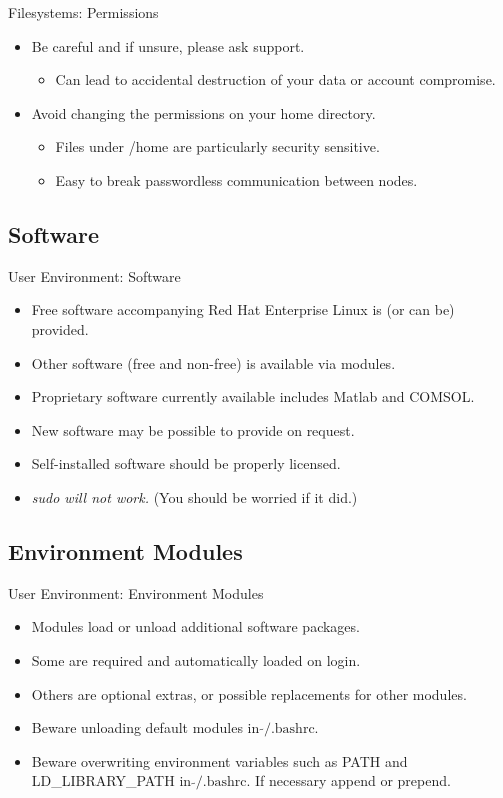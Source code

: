 \begin{frame}{Filesystems: Permissions}
\begin{itemize}
\item{\color{red}Be careful and if unsure, please ask support.}
\begin{itemize}
\item{Can lead to \alert{accidental destruction} of your data or \alert{account compromise}.}
\end{itemize}
\item{Avoid changing the permissions on your home directory.}
\begin{itemize}
\item{Files under /home are particularly security sensitive.}
\item{Easy to break passwordless communication between nodes.}
\end{itemize}
\end{itemize}
\end{frame}

\subsection{Software}
\begin{frame}{User Environment: Software}
\begin{itemize}
\item{Free software accompanying \alert{Red Hat Enterprise Linux} is (or can be) provided.}
\item{Other software (free and non-free) is available via \alert{modules}.}
\item{Proprietary software currently available includes Matlab and COMSOL.}
\item{New software may be possible to provide on request.}
\item{\alert{Self-installed software should be properly licensed.}}
  \pause
\item{\color{red}\emph{sudo will not work.}\/ (You should be worried if it did.)}
\end{itemize}
\end{frame}

\subsection{Environment Modules}
\begin{frame}[fragile]{User Environment: Environment Modules}
\begin{itemize}
\item{Modules load or unload additional software packages.}
\item{Some are \alert{required} and automatically loaded on login.}
\item{Others are optional extras, or possible replacements for other modules.}
\item{\alert{Beware} unloading default modules in $\tilde{}\text{/.bashrc}$.}
\item{\alert{Beware} overwriting environment variables such as PATH and LD\_LIBRARY\_PATH in $\tilde{}\text{/.bashrc}$. If necessary append or prepend.}
\end{itemize}
\end{frame}

